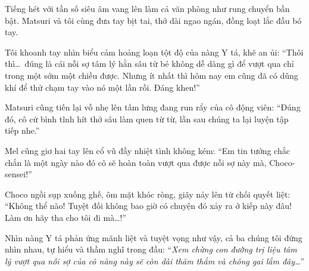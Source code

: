 \documentclass[../main.tex]{subfiles}
\begin{document}
Tiếng hét với tần số siêu âm vang lên làm cả văn phòng như rung chuyển bần bật. Matsuri và tôi cùng đưa tay bịt tai, thở dài ngao ngán, đồng loạt lắc đầu bó tay.

Tôi khoanh tay nhìn biểu cảm hoảng loạn tột độ của nàng Y tá, khẽ an ủi:
``Thôi thì\dots\ đúng là cái nỗi sợ tâm lý hằn sâu từ bé không dễ dàng gì để vượt qua chỉ trong một sớm một chiều được. Nhưng ít nhất thì hôm nay em cũng đã có dũng khí để thử chạm tay vào nó một lần rồi. Đáng khen!''

Matsuri cũng tiến lại vỗ nhẹ lên tấm lưng đang run rẩy của cô động viên:
``Đúng đó, cô cứ bình tĩnh hít thở sâu làm quen từ từ, lần sau chúng ta lại luyện tập tiếp nhe.''

Mel cũng giơ hai tay lên cổ vũ đầy nhiệt tình không kém:
``Em tin tưởng chắc chắn là một ngày nào đó cô sẽ hoàn toàn vượt qua được nỗi sợ này mà, Choco-sensei!''

Choco ngồi sụp xuống ghế, ôm mặt khóc ròng, giãy nảy lên từ chối quyết liệt:
``Không thể nào! Tuyệt đối không bao giờ có chuyện đó xảy ra ở kiếp này đâu! Làm ơn hãy tha cho tôi đi mà\dots!''

Nhìn nàng Y tá phản ứng mãnh liệt và tuyệt vọng như vậy, cả ba chúng tôi đứng nhìn nhau, tự hiểu và thầm nghĩ trong đầu: ``\textit{Xem chừng con đường trị liệu tâm lý vượt qua nỗi sợ của cô nàng này sẽ còn dài thăm thẳm và chông gai lắm đây\dots}''
\end{document}
